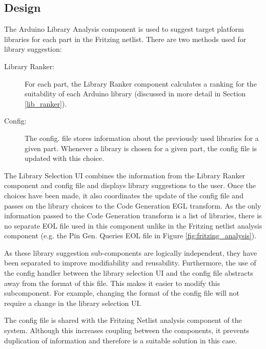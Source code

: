 \documentclass{UoYCSproject}
\begin{document}
\subsection{Design}
The Arduino Library Analysis component is used to suggest target platform libraries for each part in the Fritzing netlist. There are two methods used for library suggestion:
\begin{description}
\item[Library Ranker:] For each part, the Library Ranker component calculates a ranking for the suitability of each Arduino library (discussed in more detail in Section \ref{lib_ranker}).
\item[Config:] The config. file stores information about the previously used libraries for a given part. Whenever a library is chosen for a given part, the config file is updated with this choice. 
\end{description}

The Library Selection UI combines the information from the Library Ranker component and config file and displays library suggestions to the user. Once the choices have been made, it also coordinates the update of the config file and passes on the library choices to the Code Generation EGL transform. As the only information passed to the Code Generation transform is a list of libraries, there is no separate EOL file used in this component unlike in the Fritzing netlist analysis component (e.g. the Pin Gen. Queries EOL file in Figure \ref{fig:fritzing_analysis}).

As these library suggestion sub-components are logically independent, they have been separated to improve modifiability and reusability. Furthermore, the use of the config handler between the library selection UI and the config file abstracts away from the format of this file. This makes it easier to modify this subcomponent. For example, changing the format of the config file will not require a change in the library selection UI.

The config file is shared with the Fritzing Netlist analysis component of the system. Although this increases coupling between the components, it prevents duplication of information and therefore is a suitable solution in this case.
\end{document}
